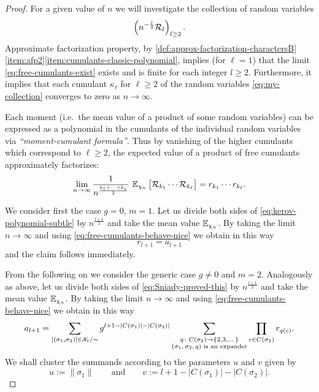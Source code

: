 \documentclass[12pt,usenames,dvipsnames,svgnames,table]{amsart}
\begin{document}
\begin{proof}
	For a given value of $n$ we will investigate the collection of
	random variables 
	\begin{equation}
	\label{eq:my-collection}
	\left( {n^{- \frac{l}{2}}} \mathcal{R}_l \right)_{l\geq 2}.    
	\end{equation}
	Approximate factorization property, by 
	\cref{def:approx-factorization-charactersB}\ref{item:afp2}\ref{item:cumulants-classic-polynomial}, 
	implies (for $\ell=1$) that
	the limit \eqref{eq:free-cumulants-exist} exists and is finite for
	each integer $l \geq 2$. Furthermore, it implies that each cumulant
	$\kappa_{\ell}$ for $\ell\geq 2$ of the random variables \eqref{eq:my-collection}
	converges to zero as $n\to\infty$.
	
	Each moment (i.e.~the mean value of a product of some random variables)
	can be expressed as a polynomial in the cumulants of the individual random variables
	via \emph{``moment-cumulant formula''}. Thus
	by vanishing of the higher cumulants which correspond to $\ell\geq 2$,
	the expected value of a product of free cumulants approximately factorizes:
	\begin{equation}
	\label{eq:free-cumulants-behave-nice}
	\lim_{n\to\infty} \frac{1}{n^{\frac{k_1+\cdots+k_\ell}{2}}} 
	\ \mathbb{E}_{\chi_n}\left[ \mathcal{R}_{k_1} \cdots \mathcal{R}_{k_\ell} \right]  =
	r_{k_1} \cdots r_{k_\ell}.
	\end{equation}
	
	We consider first the case $g=0$, $m=1$.
	Let us divide both sides of \eqref{eq:kerov-polynomial-subtle} by $n^{\frac{l+1}{2}}$
	and take the mean value $\mathbb{E}_{\chi_n}$. 
	By taking the limit $n\to\infty$ and using \eqref{eq:free-cumulants-behave-nice}
	we obtain in this way
	\[ r_{l+1}=a_{l+1} \]
	and the claim follows immediately.
	
	\medskip
	
	\newcommand{\parar}{u}
	\newcommand{\parat}{v}
	
	From the following on we consider the generic case $g\neq 0$ and $m=2$.
	Analogously as above, 
	let us divide both sides of \eqref{eq:Sniady-proved-this} by $n^{\frac{l+1}{2}}$
	and take the mean value $\mathbb{E}_{\chi_n}$. 
	By taking the limit $n\to\infty$ and using \eqref{eq:free-cumulants-behave-nice}
	we obtain in this way
	\begin{equation}
	\label{eq:totoro}
	a_{l+1} = \sum_{[(\sigma_1,\sigma_2)]\in\mathcal{X}_l/\sim} 
	g^{l+1-|C(\sigma_1)|-|C(\sigma_2)|} 
	\sum_{\substack{q\colon C(\sigma_2)\to\{2,3,\dots\} \\
			\text{$(\sigma_1,\sigma_2,q)$ is an expander}}}
	\prod_{c\in C(\sigma_2)} r_{q(c)}.
	\end{equation}
	We shall cluster the summands according to the parameters $\parar$ and $\parat$ given by
	\[ \parar := \|\sigma_1\| \qquad \text{and} \qquad 
	\parat:=l+1-|C(\sigma_1)|-|C(\sigma_2)|. \]
	

\end{proof}
\end{document}
